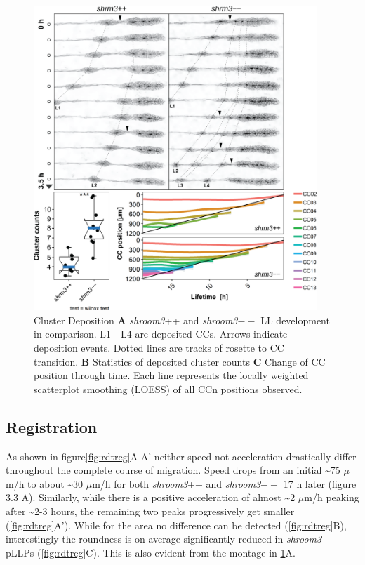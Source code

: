 \documentclass[11pt,singlespacinge,twoside]{reedthesis} %
\begin{document}
\begin{figure}

{\centering \includegraphics[width=0.95\textwidth]{figures/results/03_rosettes/tracking-01} 

}

\caption[Cluster Deposition]{Cluster Deposition \textbf{A} \emph{shroom3}++ and \emph{shroom3}\(--\) LL development in comparison. L1 - L4 are deposited CCs. Arrows indicate deposition events. Dotted lines are tracks of rosette to CC transition. \textbf{B} Statistics of deposited cluster counts \textbf{C} Change of CC position through time. Each line represents the locally weighted scatterplot smoothing (LOESS) of all CCn positions observed.}\label{fig:rdtdepo}
\end{figure}
\hypertarget{registration-1}{%
\subsection{Registration}\label{registration-1}}

As shown in figure\ref{fig:rdtreg}A-A' neither speed not acceleration drastically differ throughout the complete course of migration. Speed drops from an initial \textasciitilde{}75 \(\mu\)m/h to about \textasciitilde{}30 \(\mu\)m/h for both \emph{shroom3}++ and \emph{shroom3}\(--\) 17 h later (figure 3.3 A). Similarly, while there is a positive acceleration of almost \textasciitilde{}2 \(\mu\)m/h peaking after \textasciitilde{}2-3 hours, the remaining two peaks progressively get smaller (\ref{fig:rdtreg}A').
While for the area no difference can be detected (\ref{fig:rdtreg}B), interestingly the roundness is on average significantly reduced in \emph{shroom3}\(--\) pLLPs (\ref{fig:rdtreg}C). This is also evident from the montage in \ref{fig:rdtdepo}A.
\end{document}
